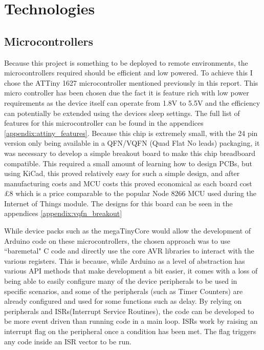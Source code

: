 \documentclass[11pt,a4paper,titlepage]{report}
\begin{document}
	\section*{Technologies}
	\subsection*{Microcontrollers}
	Because this project is something to be deployed to remote environments, the microcontrollers required should be efficient and low powered. To achieve this I chose the ATTiny 1627 microcontroller mentioned previously in this report. This micro controller has been chosen due the fact it is feature rich with low power requirements as the device itself can operate from 1.8\unit{\volt} to 5.5\unit{\volt} and the efficiency can potentially be extended using the devices sleep settings. The full list of features for this microcontroller can be found in the appendices \ref{appendix:attiny_features}. Because this chip is extremely small, with the 24 pin version only being available in a QFN/VQFN (Quad Flat No leads) packaging, it was necessary to develop a simple breakout board to make this chip breadboard compatible. This required a small amount of learning how to design PCBs, but using KiCad\cite{KICAD}, this proved relatively easy for such a simple design, and after manufacturing costs and MCU costs this proved economical as each board cost \unit{\approx}£8 which is a price comparable to the popular Node 8266 MCU used during the Internet of Things module. The designs for this board can be seen in the appendices \ref{appendix:vqfn_breakout}
	
	While device packs such as the megaTinyCore\cite{MEGATINYCORE} would allow the development of Arduino code on these microcontrollers, the chosen approach was to use ``baremetal" C code and directly use the core AVR libraries to interact with the various registers. This is because, while Arduino as a level of abstraction has various API methods that make development a bit easier, it comes with a loss of being able to easily configure many of the device peripherals to be used in specific scenarios, and some of the peripherals (such as Timer Counters) are already configured and used for some functions such as delay. By relying on peripherals and ISRs(Interrupt Service Routines), the code can be developed to be more event driven than running code in a main loop. ISRs work by raising an interrupt flag on the peripheral once a condition has been met. The flag triggers any code inside an ISR vector to be run. 
	
\end{document}

